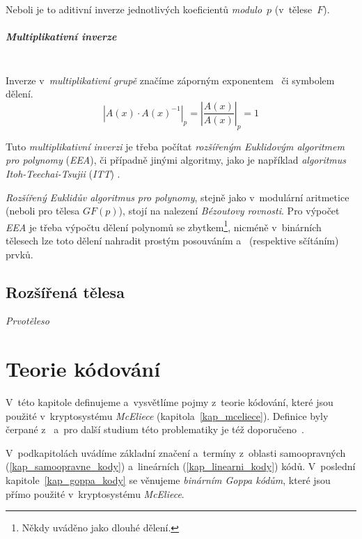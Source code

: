 \documentclass[thesis=M,czech,hidelinks]{FITthesis}[2012/06/26]
\newcommand{\0}{{\textcolor[gray]{0.75}{0}}}
\begin{document}
Neboli je to aditivní inverze jednotlivých koeficientů \emph{modulo}~$p$
(v~tělese~$F$).


\paragraph{Multiplikativní inverze} \hfil \\
Inverze v~\emph{multiplikativní grupě} značíme záporným exponentem~
či symbolem dělení.
$$
    \left| A(x) \cdot A(x)^{-1} \right|_p = \left| \frac{A(x)}{A(x)} \right|_p = 1
$$

Tuto \emph{multiplikativní inverzi} je třeba počítat \emph{rozšířeným Euklidovým
algoritmem pro polynomy} (\emph{EEA}), či případně jinými algoritmy, jako je
například \emph{algoritmus Itoh-Teechai-Tsujii} (\emph{ITT}) \cite{FIT_BHW,ITT}.

\emph{Rozšířený Euklidův algoritmus} \emph{pro polynomy}, stejně jako
v~modulární aritmetice (neboli pro tělesa $GF(p)$), stojí na nalezení
\emph{Bézoutovy rovnosti}. Pro výpočet \emph{EEA} je třeba výpočtu dělení
polynomů se zbytkem\footnote{
    Někdy uváděno jako dlouhé dělení.
}, nicméně v~binárních tělesech lze toto dělení nahradit prostým posouváním
a~ (respektive sčítáním) prvků.



\section{Rozšířená tělesa}

\emph{Prvotěleso}






\chapter{Teorie kódování}\label{kap_kody}

V~této kapitole definujeme a~vysvětlíme pojmy z~teorie kódování, které jsou
použité v~kryptosystému \emph{McEliece} (kapitola~\ref{kap_mceliece}). Definice
byly čerpané z~\cite{FIT_AAK,Adamek} a~pro další studium této problematiky je
též doporučeno~\cite{McEliece_coding}.

V~podkapitolách uvádíme základní značení a~termíny z~oblasti samoopravných
(\ref{kap_samoopravne_kody}) a~lineárních (\ref{kap_linearni_kody}) kódů.
V~poslední kapitole~\ref{kap_goppa_kody} se věnujeme \emph{binárním Goppa
kódům}, které jsou přímo použité v~kryptosystému \emph{McEliece}.
\end{document}
